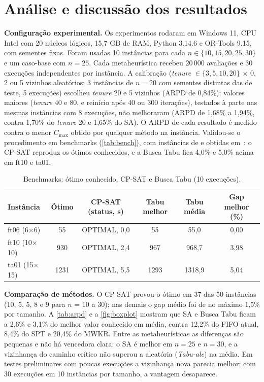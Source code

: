 \section{Análise e discussão dos resultados}

\textbf{Configuração experimental.} Os experimentos rodaram em Windows 11, CPU Intel com 20 núcleos lógicos, 15,7 GB de RAM, Python 3.14.6 e OR-Tools 9.15, com sementes fixas. Foram usadas 10 instâncias para cada $n \in \{10,15,20,25,30\}$ e um caso-base com $n=25$. Cada metaheurística recebeu 20\,000 avaliações e 30 execuções independentes por instância. A calibração (\textit{tenure} $\in\{3,5,10,20\}$ $\times$ 0, 2 ou 5 vizinhos aleatórios; 3 instâncias de $n=20$ com sementes distintas das de teste, 5 execuções) escolheu \textit{tenure} 20 e 5 vizinhos (ARPD de 0,84\%); valores maiores (\textit{tenure} 40 e 80, e reinício após 40 ou 300 iterações), testados à parte nas mesmas instâncias com 8 execuções, não melhoraram (ARPD de 1,68\% a 1,94\%, contra 1,70\% do \textit{tenure} 20 e 1,65\% do SA). O ARPD de cada resultado é medido contra o menor $C_{\max}$ obtido por qualquer método na instância. Validou-se o procedimento em benchmarks (\autoref{tab:bench}), com instâncias de  e  obtidas em~\cite{jsplib}: o CP-SAT reproduz os ótimos conhecidos, e a Busca Tabu fica 4,0\% e 5,0\% acima em ft10 e ta01.

\begin{table}[htb]
    \centering
    \caption{\label{tab:bench} Benchmarks: ótimo conhecido, CP-SAT e Busca Tabu (10 execuções).}
    \footnotesize
    \begin{tabular}{lccccc}
        \toprule
        Instância & Ótimo & CP-SAT (status, s) & Tabu melhor & Tabu média & Gap melhor (\%) \\
        \midrule
        ft06 (6$\times$6) & 55 & OPTIMAL, 0,0 & 55 & 55,0 & 0,00 \\
        ft10 (10$\times$10) & 930 & OPTIMAL, 2,4 & 967 & 968,7 & 3,98 \\
        ta01 (15$\times$15) & 1231 & OPTIMAL, 5,5 & 1293 & 1318,9 & 5,04 \\
        \bottomrule
    \end{tabular}
\end{table}

\textbf{Comparação de métodos.} O CP-SAT provou o ótimo em 37 das 50 instâncias (10, 5, 5, 8 e 9 para $n$ = 10 a 30); nas demais o gap médio foi de no máximo 1,5\% por tamanho. A \autoref{tab:arpd} e a \autoref{fig:boxplot} mostram que SA e Busca Tabu ficam a 2,6\% e 3,1\% do melhor valor conhecido em média, contra 12,2\% do FIFO atual, 8,4\% do SPT e 20,4\% do MWKR. Entre as metaheurísticas as diferenças são pequenas e não há vencedora clara: o SA é melhor em $n=25$ e $n=30$, e a vizinhança do caminho crítico não superou a aleatória (\textit{Tabu-ale}) na média. Em testes preliminares com poucas execuções a vizinhança nova parecia melhor; com 30 execuções em 10 instâncias por tamanho, a vantagem desaparece.

